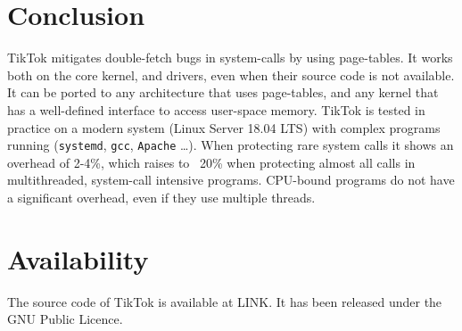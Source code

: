 \documentclass[conference]{IEEEtran}
\newcommand{\sysname}{TikTok}
\begin{document}
\section{Conclusion}

\sysname{} mitigates double-fetch bugs in system-calls by using page-tables. It
works both on the core kernel, and drivers, even when their source code is not
available. It can be ported to any architecture that uses page-tables, and any
kernel that has a well-defined interface to access user-space memory. \sysname
is tested in practice on a modern system (Linux Server 18.04 LTS) with complex
programs running (\texttt{systemd}, \texttt{gcc}, \texttt{Apache} \ldots). When
protecting rare system calls it shows an overhead of 2-4\%, which raises to
~20\% when protecting almost all calls in multithreaded, system-call intensive
programs. CPU-bound programs do not have a significant overhead, even if they
use multiple threads.

\section*{Availability}

The source code of TikTok is available at LINK. It has been released under the
GNU Public Licence.




\end{document}
